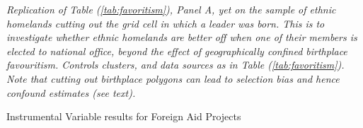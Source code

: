 \documentclass[11pt, oneside]{article}   	%
\let\oldref\ref
\renewcommand{\ref}[1]{(\oldref{#1})}
\newcommand{\mysubcaption}[1]{
\justify
\begin{spacing}{0.7}
\textit{\footnotesize #1}
\end{spacing}}
\begin{document}
\begin{table}[h]
{  }

  \mysubcaption{Replication of Table \ref{tab:favoritism}, Panel A, yet on the sample of ethnic homelands cutting out the grid cell in which a leader was born. This is to investigate whether ethnic homelands are better off when one of their members is elected to national office, beyond the effect of geographically confined birthplace favouritism. Controls clusters, and data sources as in Table \ref{tab:favoritism}. Note that cutting out birthplace polygons can lead to selection bias and hence confound estimates (see text).}
  \end{table}


\begin{table}[!h] \centering
    \caption{Instrumental Variable results for Foreign Aid Projects}
    \label{tab:APP:Aid_IV}
    \resizebox{\textwidth}{!}{

}
\end{table}
\end{document}
